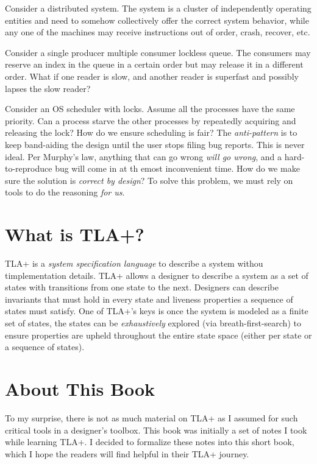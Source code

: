 Consider a distributed system. The system is a cluster of independently operating
entities and need to somehow collectively offer the correct system behavior,
while any one of the machines may receive instructions out of order, crash,
recover, etc. \newline

Consider a single producer multiple consumer lockless queue. The consumers may
reserve an index in the queue in a certain order but may release it in a
different order. What if one reader is slow, and another reader is superfast
and possibly lapses the slow reader? \newline

Consider an OS scheduler with locks. Assume all the processes have the
same priority. Can a process starve the other processes by repeatedly acquiring
and releasing the lock? How do we ensure scheduling is fair?\newline
The \textit{anti-pattern} is to keep band-aiding the design until the user
stops filing bug reports. This is never ideal. Per Murphy's law, anything that
can go wrong \textit{will go wrong}, and a hard-to-reproduce bug will come in at
th emost inconvenient time. How do we make sure the solution is \textit{correct
by design}? To solve this problem, we must rely on tools to do the
reasoning \textit{for us}.

\section{What is TLA+?}

TLA+ is a \textit{system specification language} to describe a system
withou timplementation details. TLA+ allows a designer to describe a system as a
set of states with transitions from one state to the next. Designers can
describe invariants that must hold in every state and liveness properties a
sequence of states must satisfy. One of TLA+'s keys is once the system is modeled
as a finite set of states, the states can be \textit{exhaustively} explored
(via breath-first-search) to ensure properties are upheld throughout the entire
state space (either per state or a sequence of states).

\section{About This Book}
To my surprise, there is not as much material on TLA+ as I assumed for
such critical tools in a designer's toolbox. This book was initially a set of
notes I took while learning TLA+. I decided to formalize these notes into this
short book, which I hope the readers will find helpful in their TLA+
journey.\newline

